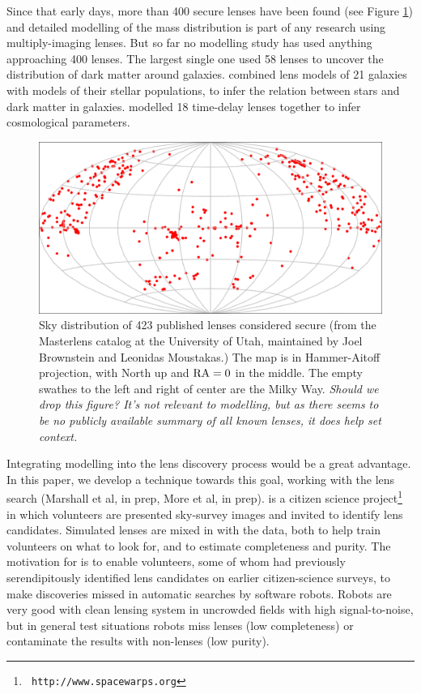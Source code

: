 Since that early days, more than 400 secure lenses have been found
(see Figure \ref{fig:masterlens}) and detailed modelling of the mass
distribution is part of any research using multiply-imaging lenses.
But so far no modelling study has used anything approaching 400
lenses.  The largest single one \citep{2009ApJ...703L..51K} used 58
lenses to uncover the distribution of dark matter around galaxies.
\cite{2011ApJ...740...97L} combined lens models of 21 galaxies with
models of their stellar populations, to infer the relation between
stars and dark matter in galaxies.  \cite{2014MNRAS.437..600S}
modelled 18 time-delay lenses together to infer cosmological
parameters.

\begin{figure}
\centering
\includegraphics[width=\hsize]{fig/lenssky}
\caption{Sky distribution of 423 published lenses considered secure
  (from the Masterlens catalog at the University of Utah, maintained
  by Joel Brownstein and Leonidas Moustakas.) The map is in
  Hammer-Aitoff projection, with North up and $\rm RA=0$ in the
  middle. The empty swathes to the left and right of center are the
  Milky Way. {\em Should we drop this figure?  It's not relevant to
    modelling, but as there seems to be no publicly available summary
    of all known lenses, it does help set context.}}
\label{fig:masterlens}
\end{figure}

Integrating modelling into the lens discovery process would be a great
advantage.  In this paper, we develop a technique towards this goal,
working with the \sw lens search (Marshall et al, in prep, More et al,
in prep).  \sw is a citizen science project\footnote{\tt
  http://www.spacewarps.org} in which volunteers are presented
sky-survey images and invited to identify lens candidates.  Simulated
lenses are mixed in with the data, both to help train volunteers on
what to look for, and to estimate completeness and purity.  The
motivation for \sw is to enable volunteers, some of whom had
previously serendipitously identified lens candidates on earlier
citizen-science surveys, to make discoveries missed in automatic
searches by software robots.  Robots are very good with clean lensing
system in uncrowded fields with high signal-to-noise, but in general
test situations \citep{2009ApJ...694..924M} robots miss lenses (low
completeness) or contaminate the results with non-lenses (low purity).

